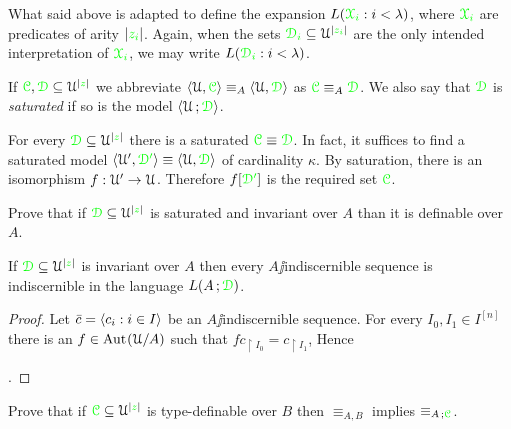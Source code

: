 \documentclass[creche.tex]{subfiles}
\begin{document}
What said above is adapted to define the expansion  \emph{$L({\color{green}\EuScript X_i}:i<\lambda)$}, where ${\color{green}\EuScript X_i}$ are predicates of arity $|{\color{green} z_i}|$. Again, when the sets ${\color{green}\EuScript D_i}\subseteq\EuScript U^{|{\color{green} z_i}|}$ are the only intended interpretation of  ${\color{green}\EuScript X_i}$, we may write \emph{$L({\color{green}\EuScript D_i}:i<\lambda)$}.

If ${\color{green}\EuScript C},{\color{green}\EuScript D}\subseteq\EuScript U^{|{\color{green} z}|}$ we abbreviate $\langle\EuScript U,{\color{green}\EuScript C}\rangle\equiv_A\langle\EuScript U,{\color{green}\EuScript D}\rangle$ as ${\color{green}\EuScript C}\equiv_A{\color{green}\EuScript D}$. We also say that ${\color{green}\EuScript D}$ is \emph{saturated\/} if so is the model $\langle\EuScript U\,;{\color{green}\EuScript D}\rangle$.

\begin{remark}\label{rem_el_sat}
For every ${\color{green}\EuScript D}\subseteq\EuScript U^{|{\color{green} z}|}$ there is a saturated ${\color{green}\EuScript C}\equiv{\color{green}\EuScript D}$. In fact, it suffices to find a saturated model $\langle\EuScript U',{\color{green}\EuScript D'}\rangle\equiv\langle\EuScript U,{\color{green}\EuScript D}\rangle$ of cardinality $\kappa$. By saturation, there is an isomorphism $f:\EuScript U'\to\EuScript U$. Therefore $f[{\color{green}\EuScript D'}]$ is the required set ${\color{green}\EuScript C}$.\QED
\end{remark}

\begin{exercise}
Prove that if ${\color{green}\EuScript D}\subseteq\EuScript U^{|{\color{green} z}|}$ is saturated and invariant over $A$ than it is definable over $A$.\QED
\end{exercise} 

\begin{proposition}\label{prop_indiscernible_L(A,D)}
If ${\color{green}\EuScript D}\subseteq\EuScript U^{|{\color{green} z}|}$ is invariant over $A$ then every $A\jj$indiscernible sequence is indiscernible in the language $L(A\,;{\color{green}\EuScript D})$.
\end{proposition}

\begin{proof}
Let $\bar c=\langle c_i:i\in I\rangle$ be an $A\jj$indiscernible sequence. For every $I_0,I_1\in I^{[n]}$ there is an $f\in\textrm{Aut\kern.15ex}(\EuScript U/A)$ such that $fc_{\restriction I_0}=c_{\restriction I_1}$, Hence 

.
\end{proof}


\begin{exercise}
Prove that if ${\color{green}\EuScript C}\subseteq\EuScript U^{|{\color{green} z}|}$ is type-definable over $B$ then $\equiv_{A,B}$ implies $\equiv_{A\,;{\color{green}\EuScript C}}$.\QED
\end{exercise} 



\end{document}
